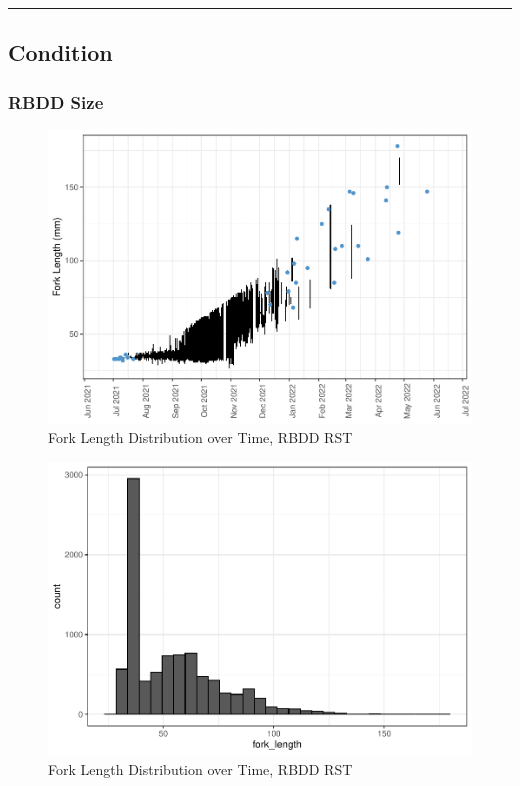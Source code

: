 \documentclass[
]{book}
\theoremstyle{definition}
\theoremstyle{definition}
\theoremstyle{definition}
\theoremstyle{definition}
\theoremstyle{remark}
\begin{document}
\begin{center}\rule{0.5\linewidth}{0.5pt}\end{center}

\hypertarget{condition}{%
\subsection{Condition}\label{condition}}

\hypertarget{rbdd-size}{%
\subsubsection{RBDD Size}\label{rbdd-size}}

\begin{figure}
\centering
\includegraphics{_main_files/figure-latex/rbdd-fl-fig-1.pdf}
\caption{\label{fig:rbdd-fl-fig}Fork Length Distribution over Time, RBDD RST}
\end{figure}

\begin{figure}
\centering
\includegraphics{_main_files/figure-latex/rbdd-flhist-fig-1.pdf}
\caption{\label{fig:rbdd-flhist-fig}Fork Length Distribution over Time, RBDD RST}
\end{figure}
\end{document}
